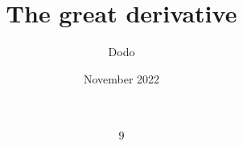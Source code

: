 \documentclass{article}
\title{The great derivative}
\author{Dodo}
\date{November 2022}
\begin{document}
    \maketitle
    \[{9}\]

	
\end{document}
